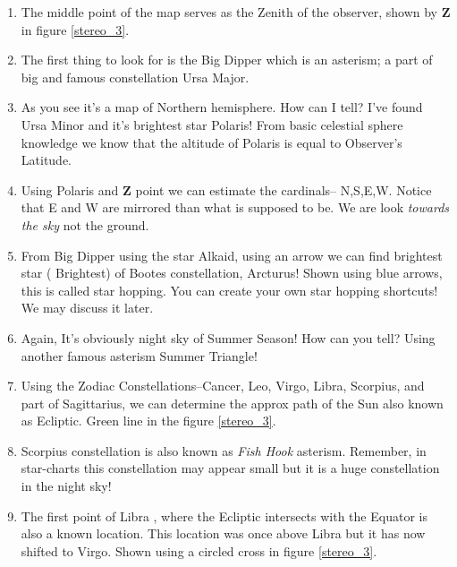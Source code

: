 \documentclass[a4paper,12pt]{extarticle}
\begin{document}
\begin{enumerate}
	\itemsep0em 
    \item The middle point of the map serves as the Zenith of the observer, shown by \textbf{Z} in figure \ref{stereo_3}.
    \item The first thing to look for is the Big Dipper which is an asterism; a part of big and famous constellation Ursa Major.
    \item As you see it’s a map of Northern hemisphere. How can I tell? I've found Ursa Minor and it's brightest star Polaris! From basic celestial sphere knowledge we know that the altitude of Polaris is equal to Observer's Latitude.
    \item Using Polaris and \textbf{Z} point we can estimate the cardinals-- N,S,E,W. Notice that E and W are mirrored than what is supposed to be. We are look \textit{towards the sky} not the ground.
    \item From Big Dipper using the star Alkaid, using an arrow we can find brightest star ( Brightest) of Bootes constellation, Arcturus! Shown using blue arrows, this is called star hopping. You can create your own star hopping shortcuts! We may discuss it later.
    \item Again, It's obviously night sky of Summer Season! How can you tell? Using another famous asterism Summer Triangle!
    \item Using the Zodiac Constellations--Cancer, Leo, Virgo, Libra, Scorpius, and part of Sagittarius, we can determine the approx path of the Sun also known as Ecliptic. Green line in the figure \ref{stereo_3}.
    \item Scorpius constellation is also known as \textit{Fish Hook} asterism. Remember, in star-charts this constellation may appear small but it is a huge constellation in the night sky!
    \item The first point of Libra \libra , where the Ecliptic intersects with the Equator is also a known location. This location was once above Libra but it has now shifted to Virgo. Shown using a circled cross in figure \ref{stereo_3}. 
\end{enumerate}
\end{document}
